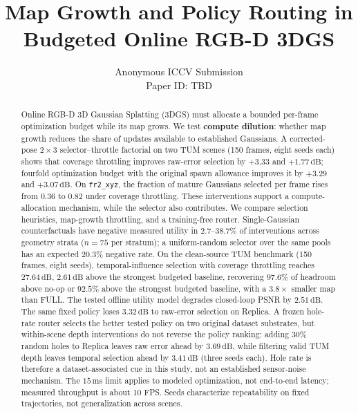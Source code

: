 \documentclass[10pt,twocolumn,letterpaper]{article}
\title{\textbf{Map Growth and Policy Routing in Budgeted Online RGB-D 3DGS}}
\author{
Anonymous ICCV Submission\\
Paper ID: TBD
}
\date{}
\begin{document}
\maketitle

\begin{abstract}
Online RGB-D 3D Gaussian Splatting (3DGS) must allocate a bounded per-frame optimization budget while its map grows. We test \textbf{compute dilution}: whether map growth reduces the share of updates available to established Gaussians. A corrected-pose $2\times3$ selector--throttle factorial on two TUM scenes (150 frames, eight seeds each) shows that coverage throttling improves raw-error selection by $+3.33$ and $+1.77\,\mathrm{dB}$; fourfold optimization budget with the original spawn allowance improves it by $+3.29$ and $+3.07\,\mathrm{dB}$. On \texttt{fr2\_xyz}, the fraction of mature Gaussians selected per frame rises from $0.36$ to $0.82$ under coverage throttling. These interventions support a compute-allocation mechanism, while the selector also contributes.
We compare selection heuristics, map-growth throttling, and a training-free router. Single-Gaussian counterfactuals have negative measured utility in $2.7$--$38.7\%$ of interventions across geometry strata ($n=75$ per stratum); a uniform-random selector over the same pools has an expected $20.3\%$ negative rate. On the clean-source TUM benchmark (150 frames, eight seeds), temporal-influence selection with coverage throttling reaches $27.64\,\mathrm{dB}$, $2.61\,\mathrm{dB}$ above the strongest budgeted baseline, recovering $97.6\%$ of headroom above no-op or $92.5\%$ above the strongest budgeted baseline, with a $3.8\times$ smaller map than FULL. The tested offline utility model degrades closed-loop PSNR by $2.51\,\mathrm{dB}$.
The same fixed policy loses $3.32\,\mathrm{dB}$ to raw-error selection on Replica. A frozen hole-rate router selects the better tested policy on two original dataset substrates, but within-scene depth interventions do not reverse the policy ranking: adding 30\% random holes to Replica leaves raw error ahead by $3.69\,\mathrm{dB}$, while filtering valid TUM depth leaves temporal selection ahead by $3.41\,\mathrm{dB}$ (three seeds each). Hole rate is therefore a dataset-associated cue in this study, not an established sensor-noise mechanism. The $15\,\mathrm{ms}$ limit applies to modeled optimization, not end-to-end latency; measured throughput is about 10 FPS. Seeds characterize repeatability on fixed trajectories, not generalization across scenes.
\end{abstract}
\end{document}
